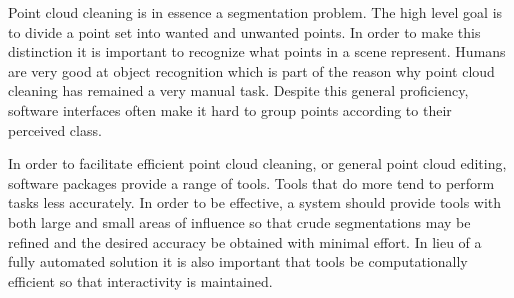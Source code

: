 



Point cloud cleaning is in essence a segmentation problem. The high level goal is to divide a point set into wanted and unwanted points. In order to make this distinction it is important to recognize what points in a scene represent. Humans are very good at object recognition which is part of the reason why point cloud cleaning has remained a very manual task. Despite this general proficiency, software interfaces often make it hard to group points according to their perceived class.

In order to facilitate efficient point cloud cleaning, or general point cloud editing, software packages provide a range of tools. Tools that do more tend to perform tasks less accurately. In order to be effective, a system should provide tools with both large and small areas of influence so that crude segmentations may be refined and the desired accuracy be obtained with minimal effort. In lieu of a fully automated solution it is also important that tools be computationally efficient so that interactivity is maintained.






